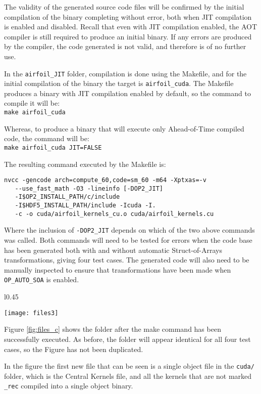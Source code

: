 The validity of the generated source code files will be confirmed by the initial compilation of the binary completing without error, both when JIT compilation is enabled and disabled. Recall that even with JIT compilation enabled, the AOT compiler is still required to produce an initial binary. If any errors are produced by the compiler, the code generated is not valid, and therefore is of no further use.
\par
In the \verb|airfoil_JIT| folder, compilation is done using the Makefile, and for the initial compilation of the binary the target is \verb|airfoil_cuda|. The Makefile produces a binary with JIT compilation enabled by default, so the command to compile it will be: \\\verb|make airfoil_cuda|
\par Whereas, to produce a binary that will execute only Ahead-of-Time compiled code, the command will be: \\\verb|make airfoil_cuda JIT=FALSE|
\par \noindent The resulting command executed by the Makefile is: \vspace{-1em}
\begin{verbatim}
nvcc -gencode arch=compute_60,code=sm_60 -m64 -Xptxas=-v
   --use_fast_math -O3 -lineinfo [-DOP2_JIT]
   -I$OP2_INSTALL_PATH/c/include
   -I$HDF5_INSTALL_PATH/include -Icuda -I.
   -c -o cuda/airfoil_kernels_cu.o cuda/airfoil_kernels.cu
\end{verbatim}
Where the inclusion of \verb|-DOP2_JIT| depends on which of the two above commands was called. Both commands will need to be tested for errors when the code base has been generated both with and without automatic Struct-of-Arrays transformations, giving four test cases. The generated code will also need to be manually inspected to ensure that transformations have been made when \verb|OP_AUTO_SOA| is enabled.
\begin{wrapfigure}[18]{l}{0.45\textwidth}
\caption{\textit{airfoil} folder after Ahead-of-Time compilation}
\label{fig:files_c}
\texttt{[image: files3]}
\end{wrapfigure}
\par
Figure \ref{fig:files_c} shows the folder after the make command has been successfully executed. As before, the folder will appear identical for all four test cases, so the Figure has not been duplicated.\par
In the figure the first new file that can be seen is a single object file in the \verb|cuda/| folder, which is the Central Kernels file, and all the kernels that are not marked \verb|_rec| compiled into a single object binary.
